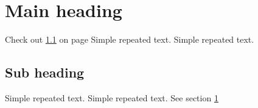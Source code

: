 \documentclass{article}
\begin{document}
\section{Main heading}
\label{secMainHeading}

Check out \ref{ssecSubHeading} on page \pageref{ssecSubHeading}
Simple repeated text.
Simple repeated text.

\subsection{Sub heading}
\label{ssecSubHeading}

Simple repeated text.
Simple repeated text.
See section \ref{secMainHeading}
\end{document}
